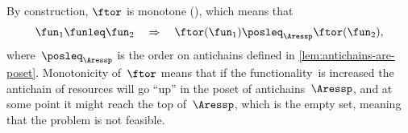 By construction, $\ftor$ is monotone (), which
means that
\[
    \fun_{1}\funleq\fun_{2}\quad\Rightarrow\quad\ftor(\fun_{1})\posleq_{\Aressp}\ftor(\fun_{2}),
\]
where~$\posleq_{\Aressp}$ is the order on antichains defined in
\cref{lem:antichains-are-poset}. Monotonicity of~$\ftor$ means that
if the functionality~\fun is increased the antichain of resources
will go ``up'' in the poset of antichains~$\Aressp$, and at some
point it might reach the top of~$\Aressp$, which is the empty set,
meaning that the problem is not feasible.




